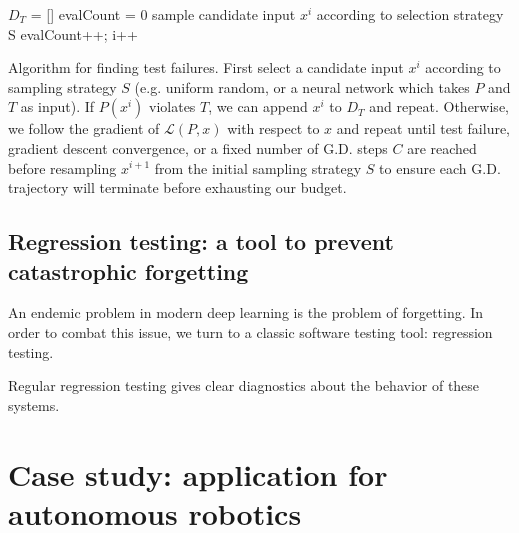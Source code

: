 \documentclass[12pt,initial,twoside,maitrise]{dms}
\numberwithin{equation}{section}
\numberwithin{table}{chapter}
\numberwithin{figure}{chapter}
\begin{document}
\begin{algorithm}

    $D_T$ = []\;
    evalCount = 0\;
     {
    sample candidate input $x^i$ according to selection strategy S\;
    evalCount++; i++\;
    }

    \caption{Algorithm for finding test failures. First select a candidate input $x^i$ according to sampling strategy $S$ (e.g. uniform random, or a neural network which takes $P$ and $T$ as input). If $P(x^i)$ violates $T$, we can append $x^i$ to $D_T$ and repeat. Otherwise, we follow the gradient of $\mathcal{L}(P, x)$ with respect to $x$ and repeat until test failure, gradient descent convergence, or a fixed number of G.D. steps $C$ are reached before resampling $x^{i+1}$ from the initial sampling strategy $S$ to ensure each G.D. trajectory will terminate before exhausting our budget.}
\end{algorithm}

\section{Regression testing: a tool to prevent catastrophic forgetting}

An endemic problem in modern deep learning is the problem of forgetting. In order to combat this issue, we turn to a classic software testing tool: regression testing.

Regular regression testing gives clear diagnostics about the behavior of these systems.

\chapter{Case study: application for autonomous robotics}
\end{document}
